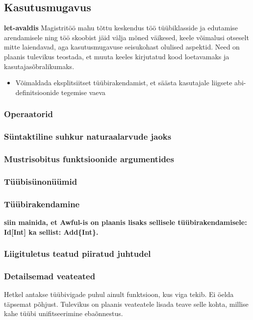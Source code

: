 \documentclass[12pt]{article}
\newcommand\markus[1]{\textcolor{roheline}{\textbf{#1}}}
\begin{document}
    \subsection{Kasutusmugavus}
      \markus{let-avaldis} Magistritöö mahu tõttu keskendus töö tüübiklasside ja edutamise arendamisele ning töö skoobist jäid välja mõned väikesed, keele võimalusi otseselt mitte laiendavad, aga kasutusmugavuse seisukohast olulised aspektid. Need on plaanis tulevikus teostada, et muuta keeles kirjutatud kood loetavamaks ja kasutajasõbralikumaks.
      \begin{itemize}
        \item
          Võimaldada eksplitsiitset tüübirakendamist, et säästa kasutajale liigsete abi-definitsioonide tegemise vaeva
      \end{itemize}
      \subsubsection{Operaatorid}
        
      \subsubsection{Süntaktiline suhkur naturaalarvude jaoks}
        
      \subsubsection{Mustrisobitus funktsioonide argumentides}
        
      \subsubsection{Tüübisünonüümid}
        
      \subsubsection{Tüübirakendamine}
        \markus{siin mainida, et Awful-is on plaanis lisaks sellisele tüübirakendamisele: Id[Int] ka sellist: Add\{Int\}.}
      \subsubsection{Liigituletus teatud piiratud juhtudel}
        
      \subsubsection{Detailsemad veateated}
        Hetkel antakse tüübivigade puhul ainult funktsioon, kus viga tekib. Ei öelda täpsemat põhjust. Tulevikus on plaanis veateatele lisada teave selle kohta, millise kahe tüübi unifitseerimine ebaõnnestus.
\end{document}
